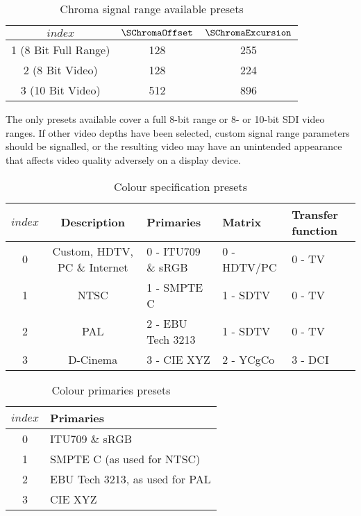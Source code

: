 \begin{table}[!ht]
\centering
\begin{tabular}{|c|c|c|}
\hline
$index$ & $\SChromaOffset$ & $\SChromaExcursion$ \\
\hline
1 (8 Bit Full Range) & 128 & 255 \\
\hline
2 (8 Bit Video) & 128 & 224 \\
\hline
3 (10 Bit Video) & 512 & 896 \\
\hline
\end{tabular}
\caption{Chroma signal range available presets}\label{table:chromasignalrangevalues}
\end{table}

\begin{informative}
The only presets available cover a full 8-bit range or 8- or 10-bit SDI video ranges.
If other video depths have been selected, custom signal range parameters
should be signalled, or the resulting video may have an unintended appearance that
affects video quality adversely on a display device.
\end{informative}

\begin{table}[!ht]
\centering
\begin{tabular}{|c|c|l|l|l|}
\hline
$index$ & {\bf Description}           & {\bf Primaries}       & {\bf Matrix}  & {\bf Transfer function}\\
\hline
0 & Custom, HDTV, PC \& Internet & 0 - ITU709 \& sRGB & 0 - HDTV/PC & 0 - TV \\ 
\hline
1 & NTSC                                    & 1 - SMPTE C           & 1 - SDTV      & 0 - TV \\
\hline
2 & PAL                                       & 2 - EBU Tech 3213   & 1 - SDTV      & 0 - TV \\
\hline
3 & D-Cinema                              & 3 - CIE XYZ             & 2 - YCgCo     & 3 - DCI \\
\hline
\end{tabular}
\caption{Colour specification presets}\label{table:colourspecvalues}
\end{table}

\begin{table}[!ht]
\centering
\begin{tabular}{|c|l|}
\hline
$index$ &  {\bf Primaries}      \\
\hline
0          &  ITU709 \& sRGB  \\ 
\hline
1          &  SMPTE C (as used for NTSC)          \\
\hline
2          &  EBU Tech 3213, as used for PAL   \\
\hline
3          & CIE XYZ              \\
\hline
\end{tabular}
\caption{Colour primaries presets}\label{table:primariesvalues}
\end{table}


